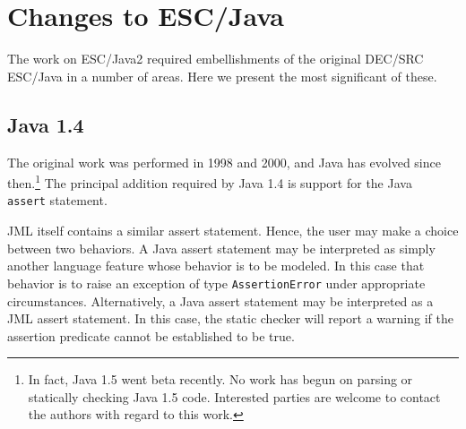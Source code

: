 \documentclass{acm_proc_article-sp}
\begin{document}
\section{Changes to ESC/Java}

The work on ESC/Java2 required embellishments of the original DEC/SRC
ESC/Java in a number of areas.  Here we present the most significant
of these.
\subsection{Java 1.4}
The original work was performed in 1998 and 2000, and Java has evolved
since then.\footnote{In fact, Java 1.5 went beta recently.  No work has begun on
  parsing or statically checking Java 1.5 code.  Interested parties
  are welcome to contact the authors with regard to this work.}  The
principal addition required by Java 1.4 is support for the Java {\tt
  assert} statement.  

JML itself contains a similar assert statement.  Hence, the user may make a choice between
two behaviors.  A Java assert statement may be interpreted as simply another language
feature whose behavior is to be modeled.  In this case that behavior is to raise an
exception of type \texttt{AssertionError} under appropriate circumstances.  Alternatively, 
a Java assert statement may be interpreted as a JML assert statement.  In this case, the
static checker will report a warning if the assertion predicate cannot be established to be true.
\end{document}
